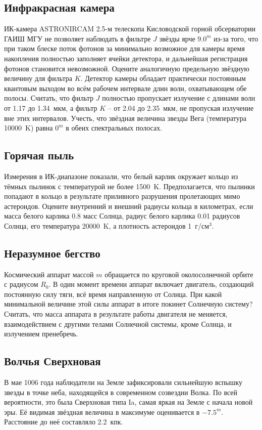 \documentclass[12pt]{article}
\begin{document}
\subsection{Инфракрасная камера}
ИК-камера ASTRONIRCAM 2.5-м телескопа Кисловодской горной обсерватории ГАИШ МГУ не
позволяет наблюдать в фильтре $J$ звёзды ярче $9.0^m$ из-за того, что при таком
блеске поток фотонов за минимально возможное для камеры время накопления полностью
заполняет ячейки детектора, и дальнейшая регистрация фотонов становится невозможной.
Оцените аналогичную предельную звёздную величину для фильтра $K$. Детектор камеры
обладает практически постоянным квантовым выходом во всём рабочем интервале длин
волн, охватывающем обе полосы. Считать, что фильтр $J$ полностью пропускает излучение
с длинами волн от 1.17 до 1.34~мкм, а фильтр $K$ -- от 2.04 до 2.35~мкм, не пропуская
излучение вне этих интервалов. Учесть, что звёздная величина звезды Вега (температура
10000~K) равна $0^m$ в обеих спектральных полосах.

\subsection{Горячая пыль}
Измерения в ИК-диапазоне показали, что белый карлик окружает кольцо из тёмных
пылинок с температурой не более 1500~K. Предполагается, что пылинки попадают в
кольцо в результате приливного разрушения пролетающих мимо астероидов. Оцените
внутренний и внешний радиусы кольца в километрах, если масса белого карлика 0.8 масс
Солнца, радиус белого карлика 0.01 радиусов Солнца, его температура 20000~K, а
плотность астероидов 1~г/см$^3$.

\subsection{Неразумное бегство}
Космический аппарат массой $m$ обращается по круговой околосолнечной орбите с
радиусом $R_0$. В один момент времени аппарат включает двигатель, создающий
постоянную силу тяги, всё время направленную от Солнца. При какой минимальной
величине этой силы аппарат в итоге покинет Солнечную систему? Считать, что масса
аппарата в результате работы двигателя не меняется, взаимодействием с другими телами
Солнечной системы, кроме Солнца, и излучением пренебречь.

\subsection{Волчья Сверхновая}
В мае 1006 года наблюдатели на Земле зафиксировали сильнейшую вспышку звезды в точке
неба, находящейся в современном созвездии Волка. По всей вероятности, это была
Сверхновая типа Ia, самая яркая на Земле с начала новой эры. Её видимая звёздная
величина в максимуме оценивается в $-7.5^m$. Расстояние до неё составляло 2.2~кпк.
\end{document}
